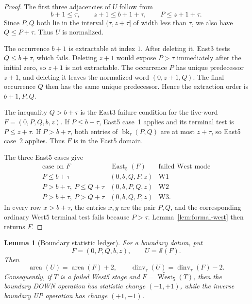 \documentclass[11pt]{article}
\newtheorem{lemma}[theorem]{Lemma}
\theoremstyle{definition}
\theoremstyle{remark}
\newcommand{\area}{\operatorname{area}}
\newcommand{\dinv}{\operatorname{dinv}}
\newcommand{\East}{\operatorname{East}}
\newcommand{\West}{\operatorname{West}}
\newcommand{\bk}{\operatorname{bk}}
\newcommand{\Save}{\mathcal S}
\begin{document}
\begin{proof}
The first three adjacencies of $U$ follow from
\[
 b+1\le\tau,
 \qquad z+1\le b+1+\tau,
 \qquad P\le z+1+\tau.
\]
Since $P,Q$ both lie in the interval $(\tau,z+\tau]$ of width less than
$\tau$, we also have $Q\le P+\tau$.  Thus $U$ is normalized.

The occurrence $b+1$ is extractable at index $1$.  After deleting it,
East3 tests $Q\le b+\tau$, which fails.  Deleting $z+1$ would expose
$P>\tau$ immediately after the initial zero, so $z+1$ is not extractable.
The occurrence $P$ has unique predecessor $z+1$, and deleting it leaves the
normalized word $(0,z+1,Q)$.  The final occurrence $Q$ then has the same
unique predecessor.  Hence the extraction order is $b+1,P,Q$.

The inequality $Q>b+\tau$ is the East3 failure condition for the five-word
$F=(0,P,Q,b,z)$.  If $P\le b+\tau$, East5 case~1 applies and its terminal
test is $P\le z+\tau$.  If $P>b+\tau$, both entries of
$\bk_\tau(P,Q)$ are at most $z+\tau$, so East5 case~2 applies.  Thus $F$ is
in the East5 domain.

The three East5 cases give
\[
\begin{array}{c|c|c}
\text{case on }F&\East_5(F)&\text{failed West mode}\\ \hline
P\le b+\tau&(0,b,Q,P,z)&\mathrm{W1}\\
P>b+\tau,\ P\le Q+\tau&(0,b,P,Q,z)&\mathrm{W2}\\
P>b+\tau,\ P>Q+\tau&(0,b,Q,P,z)&\mathrm{W3}.
\end{array}
\]
In every row $x>b+\tau$, the entries $x,y$ are the pair $P,Q$, and the
corresponding ordinary West5 terminal test fails because $P>\tau$.
Lemma~\ref{lem:formal-west} then returns $F$.
\end{proof}

\begin{lemma}[Boundary statistic ledger]
\label{lem:boundary-stat}
For a boundary datum, put
\[
 F=(0,P,Q,b,z),
 \qquad U=\Save(F).
\]
Then
\begin{equation}
 \area(U)=\area(F)+2,
 \qquad
 \dinv_\tau(U)=\dinv_\tau(F)-2.
 \label{eq:saving-stat}
\end{equation}
Consequently, if $T$ is a failed West5 stage and
$F=\widetilde{\West}_5(T)$, then the boundary DOWN operation has statistic
change $(-1,+1)$, while the inverse boundary UP operation has change
$(+1,-1)$.
\end{lemma}
\end{document}
